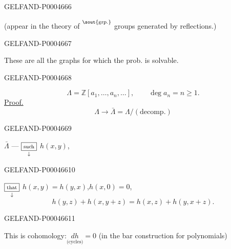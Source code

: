 \begin{GelfandAdjacentEvidence}{GELFAND-P000466}{6}


(appear in the theory of \(\overset{\text{\sout{grp.}}}{\vphantom{x}}\) groups generated by reflections.)
\end{GelfandAdjacentEvidence}
\begin{GelfandAdjacentEvidence}{GELFAND-P000466}{7}


These are all the graphs for which the prob. is solvable.


\end{GelfandAdjacentEvidence}
\begin{GelfandAdjacentEvidence}{GELFAND-P000466}{8}

\[
\Lambda=\mathbb Z[a_1,\ldots,a_n,\ldots],\qquad\deg a_n=n\ge1.
\]
\underline{Proof.}
\[
\Lambda\longrightarrow\bar\Lambda=\Lambda/(\text{decomp.})
\]
\end{GelfandAdjacentEvidence}
\begin{GelfandAdjacentEvidence}{GELFAND-P000466}{9}


$\bar\Lambda$ — 
\(\underset{\downarrow}{\boxed{\text{\scriptsize such}}}\)
 $h(x,y)$,
\end{GelfandAdjacentEvidence}
\begin{GelfandAdjacentEvidence}{GELFAND-P000466}{10}


\(\underset{\downarrow}{\boxed{\text{\scriptsize that}}}\)\quad
$h(x,y)=h(y,x)$,\quad $h(x,0)=0$,
\[
h(y,z)+h(x,y+z)=h(x,z)+h(y,x+z).
\]
\end{GelfandAdjacentEvidence}
\begin{GelfandAdjacentEvidence}{GELFAND-P000466}{11}


This is cohomology:\quad $\underset{\text{(cycles)}}{dh}=0$
\qquad (in the bar construction for polynomials)
\end{GelfandAdjacentEvidence}

